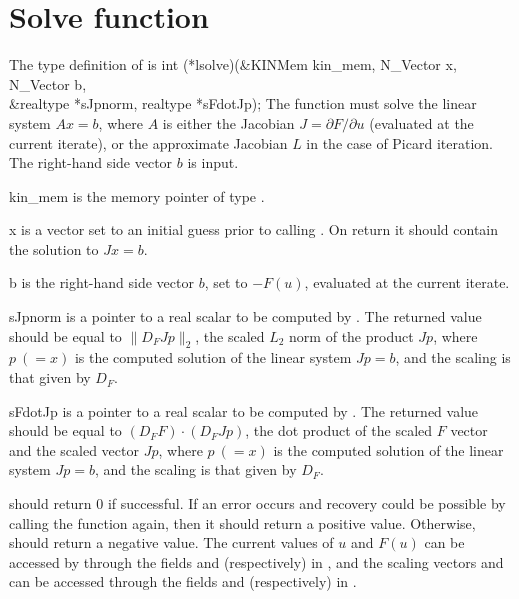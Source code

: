 \section{Solve function}
The type definition of  is
{
  int (*lsolve)(&KINMem kin\_mem, N\_Vector x, N\_Vector b, \\
                &realtype *sJpnorm, realtype *sFdotJp);
}
{
  The  function must solve the linear system $A x = b$, where $A$ is
  either the Jacobian $J = \partial F / \partial u$ (evaluated at the current
  iterate), or the approximate Jacobian $L$ in the case of Picard iteration.
  The right-hand side vector $b$ is input. 
}
{
  \begin{args}[N\_Vector]
  \item[kin\_mem]
    is the {\kinsol} memory pointer of type .
  \item[x]
    is a vector set to an initial guess prior to calling . 
    On return it should contain the solution to $J x = b$.
  \item[b]
    is the right-hand side vector $b$, set to $-F(u)$, evaluated at
    the current iterate.
  \item[sJpnorm]
    is a pointer to a real scalar to be computed by .  The returned
    value  should be equal to $\|D_F Jp\|_2$, the scaled $L_2$
    norm of the product $Jp$, where $p~(= x)$ is the computed solution of the
    linear system $J p = b$, and the scaling is that given by $D_F$.
  \item[sFdotJp]
    is a pointer to a real scalar to be computed by .  The returned
    value   should be equal to $(D_F F)\cdot(D_F Jp)$, the
    dot product of the scaled $F$ vector and the scaled vector $J p$, where
    $p~(= x)$ is the computed solution of the linear system $J p = b$,
    and the scaling is that given by $D_F$.
  \end{args}
}
{
   should return $0$ if successful.
  If an error occurs and recovery could be possible by calling the
   function again, then it should return a positive value.
  Otherwise,  should return a negative value.
}
{
  The current values of $u$ and $F(u)$ can be accessed by  through
  the fields  and  (respectively) in ,
  and the scaling vectors  and  can be accessed
  through the fields  and  (respectively)
   in .
}


